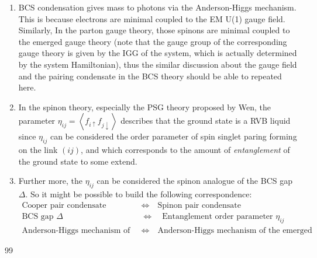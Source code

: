 \documentclass[12font]{article}
\newcommand{\anglelr}[1]{\left\langle #1 \right\rangle}
\begin{document}
\begin{enumerate}
  \item BCS condensation gives mass to photons via the Anderson-Higgs mechanism. This is because electrons are minimal coupled to the EM U(1) gauge field. Similarly, In the parton gauge theory, those spinons are minimal coupled to the emerged gauge theory (note that the gauge group of the corresponding gauge theory is given by the IGG of the system, which is actually determined by the system Hamiltonian), thus the similar discussion about the gauge field and the pairing condensate in the BCS theory should be able to repeated here.
  
  \item In the spinon theory, especially the PSG theory proposed by Wen, the parameter $\eta_{ij} = \anglelr{f_{i\uparrow}f_{j\downarrow}}$ describes that the ground state is a RVB liquid since $\eta_{ij}$ can be considered the order parameter of spin singlet paring forming on the link $(ij)$, and which corresponds to the amount of \emph{entanglement} of the ground state to some extend. 
  
  \item Further more, the $\eta_{ij}$ can be considered the spinon analogue of the BCS gap $\Delta$. So it might be possible to build the following correspondence:
      \[
      \begin{aligned}
        \text{Cooper pair condensate} \quad &\Longleftrightarrow \quad \text{Spinon pair condensate} \\
        \text{BCS gap $\Delta$} \quad &\Longleftrightarrow \quad \text{Entanglement order parameter $\eta_{ij}$} \\
        \text{Anderson-Higgs mechanism of the EM field} \quad &\Longleftrightarrow \quad \text{Anderson-Higgs mechanism of the emerged gauge field} 
      \end{aligned}
      \]
\end{enumerate}



\begin{thebibliography}{99}

    \bibitem{}{}

\end{thebibliography}
\end{document}
